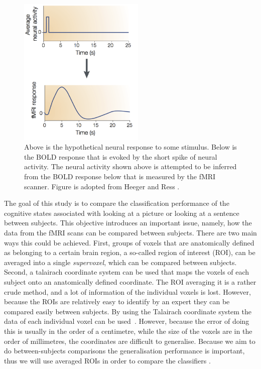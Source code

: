 \documentclass[preprint,journal,11pt]{vgtc}
\begin{document}
\begin{figure}
	\centering
	\includegraphics[width=60mm]{figures/f1_bold_response}
  	\caption{Above is the hypothetical neural response to some stimulus. Below is the BOLD response that is evoked by the short spike of neural activity. The neural activity shown above is attempted to be inferred from the BOLD response below that is measured by the fMRI scanner. Figure is adopted from Heeger and Ress \cite{he:2002na}.}
  	\label{fig:bold_response}
\end{figure}
\indent The goal of this study is to compare the classification performance of the cognitive states associated with looking at a picture or looking at a sentence between subjects. This objective introduces an important issue, namely, how the data from the fMRI scans can be compared between subjects. There are two main ways this could be achieved. First, groups of voxels that are anatomically defined as belonging to a certain brain region, a so-called region of interest (ROI), can be averaged into a single \emph{supervoxel}, which can be compared between subjects. Second, a talairach coordinate system can be used that maps the voxels of each subject onto an anatomically defined coordinate. The ROI averaging it is a rather crude method, and a lot of information of the individual voxels is lost. However, because the ROIs are relatively easy to identify by an expert they can be compared easily between subjects. By using the Talairach coordinate system the data of each individual voxel can be used~\cite{talairach1988co}. However, because the error of doing this is usually in the order of a centimetre, while the size of the voxels are in the order of millimetres, the coordinates are difficult to generalise. Because we aim to do between-subjects comparisons the generalisation performance is important, thus we will use averaged ROIs in order to compare the classifiers \cite{mi:2004coord}.
\end{document}
